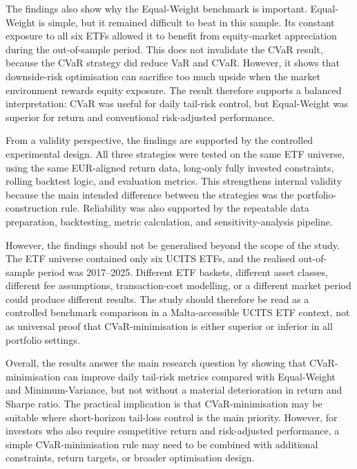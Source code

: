 \par The findings also show why the Equal-Weight benchmark is important. Equal-Weight is simple, but it remained difficult to beat in this sample. Its constant exposure to all six ETFs allowed it to benefit from equity-market appreciation during the out-of-sample period. This does not invalidate the CVaR result, because the CVaR strategy did reduce VaR and CVaR. However, it shows that downside-risk optimisation can sacrifice too much upside when the market environment rewards equity exposure. The result therefore supports a balanced interpretation: CVaR was useful for daily tail-risk control, but Equal-Weight was superior for return and conventional risk-adjusted performance.
\par From a validity perspective, the findings are supported by the controlled experimental design. All three strategies were tested on the same ETF universe, using the same EUR-aligned return data, long-only fully invested constraints, rolling backtest logic, and evaluation metrics. This strengthens internal validity because the main intended difference between the strategies was the portfolio-construction rule. Reliability was also supported by the repeatable data preparation, backtesting, metric calculation, and sensitivity-analysis pipeline.
\par However, the findings should not be generalised beyond the scope of the study. The ETF universe contained only six UCITS ETFs, and the realised out-of-sample period was 2017--2025. Different ETF baskets, different asset classes, different fee assumptions, transaction-cost modelling, or a different market period could produce different results. The study should therefore be read as a controlled benchmark comparison in a Malta-accessible UCITS ETF context, not as universal proof that CVaR-minimisation is either superior or inferior in all portfolio settings.
\par Overall, the results answer the main research question by showing that CVaR-minimisation can improve daily tail-risk metrics compared with Equal-Weight and Minimum-Variance, but not without a material deterioration in return and Sharpe ratio. The practical implication is that CVaR-minimisation may be suitable where short-horizon tail-loss control is the main priority. However, for investors who also require competitive return and risk-adjusted performance, a simple CVaR-minimisation rule may need to be combined with additional constraints, return targets, or broader optimisation design.
